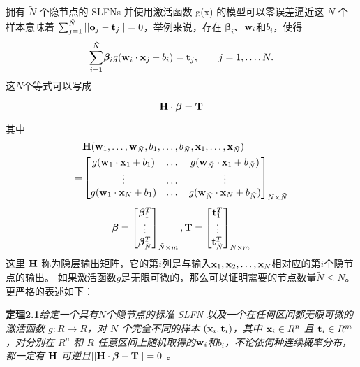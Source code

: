 \documentclass[conference]{IEEEtran}
\begin{document}
拥有 $\tilde N$ 个隐节点的 SLFNs 并使用激活函数 g(x) 的模型可以零误差逼近这 $N$ 个样本意味着 $\sum^{\tilde{N}}_{j=1}||{\bf{o}}_j-{\bf{t}}_j||=0$，举例来说，存在 $ {\bm{\beta}}_i$、${{\bf{w}}_i}$和$b_i$，使得
\begin{equation}\label{eq2}
	\overset{\tilde{N}}{\underset{i=1}{\sum}}{{\bm{\beta}}_i}g({{\bf{w}}_i}\cdot{{\bf{x}}_j}+b_i)={\bf{t}}_j,\hspace{2em}j=1,\dots,N.
\end{equation}
这$N$个等式可以写成

\begin{equation}\label{eq3}
	{\bf{H}}\cdot{\bm{\beta}}={\bf{T}}
\end{equation}

其中
\begin{equation}
	\begin{split}\label{eq4}
		& {\bf{H}}({\bf{w}}_1,\dots,{\bf{w}}_{\tilde{N}},b_1,\dots,b_{\tilde{N}},{\bf{x}}_1,\dots,{\bf{x}}_{\tilde{N}})\\
		= & \begin{bmatrix}
			g({{\bf{w}}_1}\cdot{{\bf{x}}_1}+b_1) & \dots & g({{\bf{w}}_{\tilde{N}}}\cdot{{\bf{x}}_1}+b_{\tilde{N}}) \\
			\vdots & \dots & \vdots \\
			g({{\bf{w}}_1}\cdot{{\bf{x}}_N}+b_1) & \dots & g({{\bf{w}}_{\tilde{N}}}\cdot{{\bf{x}}_N}+b_{\tilde{N}})
		\end{bmatrix}_{N\times{\tilde{N}}}
	\end{split}
\end{equation}
\begin{equation}\label{eq5}
	{\bm{\beta}}=
	\begin{bmatrix}
		{\bm{\beta}}_1^T\\
		\vdots \\
		{\bm{\beta}}_{\tilde{N}}^T
	\end{bmatrix}_{\tilde{N}\times m},
	{\bf{T}}=\begin{bmatrix}
		{\bf{t}}_1^T\\
		\vdots\\
		{\bf{t}}_{\tilde{N}}^T
	\end{bmatrix}_{N\times m}
\end{equation}
这里 ${\bf{H}}$ 称为隐层输出矩阵，它的第$i$列是与输入${\bf x}_1,{\bf x}_2,\dots,{\bf x}_N$相对应的第$i$个隐节点的输出。
如果激活函数$g$是无限可微的，那么可以证明需要的节点数量$\tilde{N}\le N$。更严格的表述如下：

\textbf{定理2.1}\textit{给定一个具有$N$个隐节点的标准 SLFN 以及一个在任何区间都无限可微的激活函数 $g: R\rightarrow R$，对 $N$ 个完全不同的样本 $({\bf x}_i,{\bf t}_i )$，其中 ${\bf x}_i\in R^n$ 且 ${\bf t}_i\in R^m$，对分别在 $R^n$ 和 $R$ 任意区间上随机取得的${\bf w}_i$和$b_i$，不论依何种连续概率分布，都一定有 ${\bf H}$ 可逆且${||\bf{H}}\cdot{\bm{\beta}}-{\bf{T}}||=0$ 。}
\end{document}

